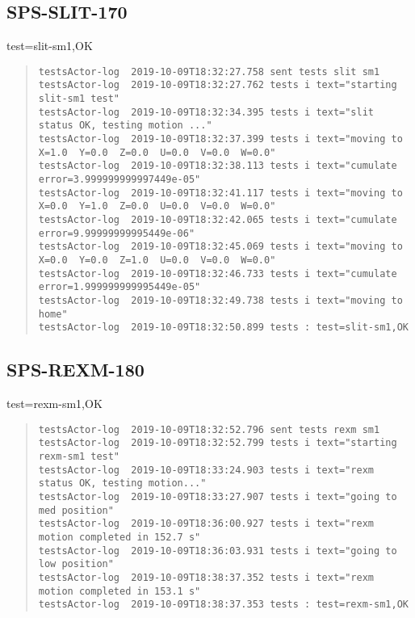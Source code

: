 \subsection{SPS-SLIT-170}
\label{sec:tc-170}

test=slit-sm1,OK

\begin{quote}
\begin{tiny}
\begin{verbatim}
testsActor-log  2019-10-09T18:32:27.758 sent tests slit sm1
testsActor-log  2019-10-09T18:32:27.762 tests i text="starting slit-sm1 test"
testsActor-log  2019-10-09T18:32:34.395 tests i text="slit status OK, testing motion ..."
testsActor-log  2019-10-09T18:32:37.399 tests i text="moving to X=1.0  Y=0.0  Z=0.0  U=0.0  V=0.0  W=0.0"
testsActor-log  2019-10-09T18:32:38.113 tests i text="cumulate error=3.999999999997449e-05"
testsActor-log  2019-10-09T18:32:41.117 tests i text="moving to X=0.0  Y=1.0  Z=0.0  U=0.0  V=0.0  W=0.0"
testsActor-log  2019-10-09T18:32:42.065 tests i text="cumulate error=9.99999999995449e-06"
testsActor-log  2019-10-09T18:32:45.069 tests i text="moving to X=0.0  Y=0.0  Z=1.0  U=0.0  V=0.0  W=0.0"
testsActor-log  2019-10-09T18:32:46.733 tests i text="cumulate error=1.999999999995449e-05"
testsActor-log  2019-10-09T18:32:49.738 tests i text="moving to home"
testsActor-log  2019-10-09T18:32:50.899 tests : test=slit-sm1,OK
\end{verbatim}
\end{tiny}
\end{quote}


\subsection{SPS-REXM-180}
\label{sec:tc-180}

test=rexm-sm1,OK

\begin{quote}
\begin{tiny}
\begin{verbatim}
testsActor-log  2019-10-09T18:32:52.796 sent tests rexm sm1
testsActor-log  2019-10-09T18:32:52.799 tests i text="starting rexm-sm1 test"
testsActor-log  2019-10-09T18:33:24.903 tests i text="rexm status OK, testing motion..."
testsActor-log  2019-10-09T18:33:27.907 tests i text="going to med position"
testsActor-log  2019-10-09T18:36:00.927 tests i text="rexm motion completed in 152.7 s"
testsActor-log  2019-10-09T18:36:03.931 tests i text="going to low position"
testsActor-log  2019-10-09T18:38:37.352 tests i text="rexm motion completed in 153.1 s"
testsActor-log  2019-10-09T18:38:37.353 tests : test=rexm-sm1,OK
\end{verbatim}
\end{tiny}
\end{quote}

